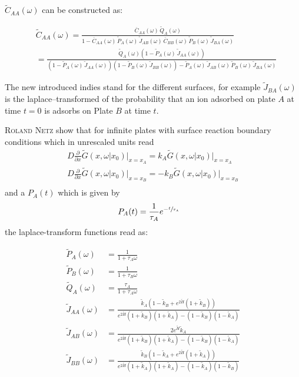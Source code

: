 \documentclass[a4paper, parskip=half]{scrartcl}
\newcommand{\person}[1]{%
	\textsc{#1}%
}
\newcommand{\myEqLabel}[1]{\label{eq:#1}}
\begin{document}
$\widetilde{C}_{AA}(\omega)$ can be constructed as:

\begin{align}
&\widetilde{C}_{AA}(\omega) = \frac{\overline{C}_{AA}(\omega) \, \widetilde{Q}_{A}(\omega)}{1-\overline{C}_{AA}(\omega)\, \widetilde{P}_A(\omega)\, \widetilde{J}_{AB}(\omega)\, \overline{C}_{BB}(\omega)\, \widetilde{P}_B(\omega)\,\widetilde{J}_{BA}(\omega)}\\
&= \frac{\widetilde{Q}_A(\omega)\left(1 - \widetilde{P}_A(\omega)\, \widetilde{J}_{AA}(\omega) \right)}{\left(1 - \widetilde{P}_A(\omega)\, \widetilde{J}_{AA}(\omega) \right)\left(1 - \widetilde{P}_B(\omega)\, \widetilde{J}_{BB}(\omega) \right) - \widetilde{P}_A(\omega)\, \widetilde{J}_{AB}(\omega)\, \widetilde{P}_B(\omega)\, \widetilde{J}_{BA}(\omega)} \myEqLabel{def_caa}
\end{align}

The new introduced indies stand for the different surfaces, for example $\widetilde{J}_{BA}(\omega)$ is the laplace--transformed of the probability that an ion adsorbed on plate $A$ at time $t=0$ is adsorbs on Plate $B$ at time $t$. 

\person{Roland Netz} show that for infinite plates with surface reaction boundary conditions which in unrescaled units read 
\begin{align}
D \frac{\partial}{\partial x}\widetilde{G}(x, \omega| x_0) \big\vert_{x=x_A} = k_A \widetilde{G}(x, \omega| x_0) \big\vert_{x=x_A} \\
D \frac{\partial}{\partial x}\widetilde{G}(x, \omega| x_0) \big\vert_{x=x_B} = - k_B \widetilde{G}(x, \omega| x_0) \big\vert_{x=x_B} \\
\end{align}
and a $P_A(t)$ which is given by
\begin{align}
P_A(t) &= \frac{1}{\tau_A} e^{-\sfrac{t}{\tau_A}} \myEqLabel{P_t}
\end{align}
the laplace-transform functions read as: 

\begin{align}
\widetilde{P}_A(\omega) &= \frac{1}{1+\tau_A\omega} \\
\widetilde{P}_B(\omega) &= \frac{1}{1+\tau_B\omega} \\
\widetilde{Q}_A(\omega) &= \frac{\tau_A}{1+\tau_A\omega} \\
\widetilde{J}_{AA}(\omega) &= \frac{\widetilde{k}_A \left(1 - \widetilde{k}_B + e^{2\widetilde{H}} (1 + \widetilde{k}_B)\right)}{e^{2\widetilde{H}}(1 + \widetilde{k}_B)(1 + \widetilde{k}_A) - (1 -  \widetilde{k}_B)(1-\widetilde{k}_A)} \\
\widetilde{J}_{AB}(\omega) &= \frac{2e^{\widetilde{H}} \widetilde{k}_A}{e^{2\widetilde{H}}(1 + \widetilde{k}_B)(1 + \widetilde{k}_A) - (1 -  \widetilde{k}_B)(1-\widetilde{k}_A)} \\
\widetilde{J}_{BB}(\omega) &= \frac{\widetilde{k}_B \left(1 - \widetilde{k}_A + e^{2\widetilde{H}} (1 + \widetilde{k}_A)\right)}{e^{2\widetilde{H}}(1 + \widetilde{k}_A)(1 + \widetilde{k}_A) - (1 -  \widetilde{k}_A)(1-\widetilde{k}_B)}
\end{align}
\end{document}
